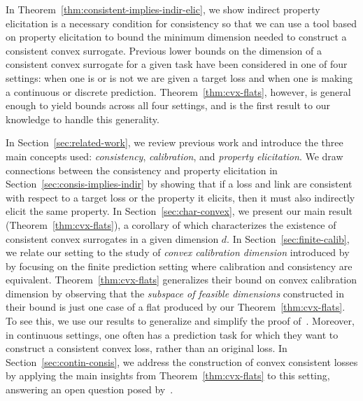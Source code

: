 \documentclass{article}
\newcommand{\reals}{\mathbb{R}}
\newcommand{\Y}{\mathcal{Y}}
\begin{document}
In Theorem~\ref{thm:consistent-implies-indir-elic}, we show indirect property elicitation is a necessary condition for consistency so that we can use a tool based on property elicitation to bound the minimum dimension needed to construct a consistent convex surrogate.
Previous lower bounds on the dimension of a consistent convex surrogate for a given task have been considered in one of four settings: when one is or is not we are given a target loss and when one is making a continuous or discrete prediction.
Theorem~\ref{thm:cvx-flats}, however, is general enough to yield bounds across all four settings, and is the first result to our knowledge to handle this generality.


In Section~\ref{sec:related-work}, we review previous work and introduce the three main concepts used: \emph{consistency}, \emph{calibration}, and \emph{property elicitation}.
We draw connections between the consistency and property elicitation in Section~\ref{sec:consis-implies-indir} by showing that if a loss and link are consistent with respect to a target loss or the property it elicits, then it must also indirectly elicit the same property.
In Section~\ref{sec:char-convex}, we present our main result (Theorem~\ref{thm:cvx-flats}), a corollary of which characterizes the existence of consistent convex surrogates in a given dimension $d$.
In Section~\ref{sec:finite-calib}, we relate our setting to the study of \emph{convex calibration dimension} introduced by~\cite{ramaswamy2016convex} by focusing on the finite prediction setting where calibration and consistency are equivalent.
Theorem~\ref{thm:cvx-flats} generalizes their bound on convex calibration dimension by observing that the \emph{subspace of feasible dimensions} constructed in their bound is just one case of a flat produced by our Theorem~\ref{thm:cvx-flats}.
To see this, we use our results to generalize and simplify the proof of~\cite[Theorem 16]{ramaswamy2016convex}.
Moreover, in continuous settings, one often has a prediction task for which they want to construct a consistent convex loss, rather than an original loss.
In Section~\ref{sec:contin-consis}, we address the construction of convex consistent losses by applying the main insights from Theorem~\ref{thm:cvx-flats} to this setting, answering an open question posed by~\cite[Section 8]{frongillo2018elicitation}.
\end{document}
